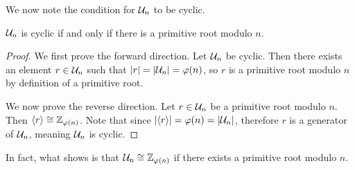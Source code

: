 We now note the condition for $\mathcal{U}_{n}$ to be cyclic.
\begin{proposition}\label{prop-Un-cyclic-only-if-exists-primitive-root}
    $\mathcal{U}_{n}$ is cyclic if and only if there is a primitive root modulo $n$.
\end{proposition}
\begin{proof}
    We first prove the forward direction. Let $\mathcal{U}_{n}$ be cyclic. Then there exists an element $r \in \mathcal{U}_{n}$ such that $|r| = |\mathcal{U}_{n}| = \varphi(n)$, so $r$ is a primitive root modulo $n$ by definition of a primitive root.

    We now prove the reverse direction. Let $r \in \mathcal{U}_{n}$ be a primitive root modulo $n$. Then $\langle r \rangle \cong \mathbb{Z}_{\varphi(n)}$. Note that since $|\langle r \rangle| = \varphi(n) = |\mathcal{U}_{n}|$, therefore $r$ is a generator of $\mathcal{U}_{n}$, meaning $\mathcal{U}_{n}$ is cyclic.
\end{proof}
\begin{remark}
    In fact, what  shows is that $\mathcal{U}_{n} \cong \mathbb{Z}_{\varphi(n)}$ if there exists a primitive root modulo $n$.
\end{remark}


